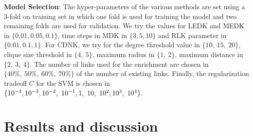 \textbf{Model Selection}: The hyper-parameters of the various methods are set using a 3-fold on training set in which one fold is used for training the model and two remaining folds are used for validation. We try the values for LEDK and MEDK in $\lbrace  0.01, 0.05, 0.1 \rbrace$, time steps in MDK in $\lbrace 3, 5, 10 \rbrace$ and RLK parameter in $\lbrace 0.01, 0.1, 1 \rbrace$. For CDNK, we try for the degree threshold value in $\lbrace 10,\ 15,\ 20 \rbrace$, clique size threshold in $\lbrace 4,\ 5 \rbrace$, maximum radius in $\lbrace 1,\ 2 \rbrace$, maximum distance in $\lbrace 2,\ 3,\ 4 \rbrace$. The number of links used for the enrichment are chosen in $\lbrace 40\%,\ 50\%,\ 60\%,\ 70\% \rbrace$ of the number of existing links. Finally, the regularization tradeoff $C$ for the SVM is chosen in $\lbrace 10^{-4}, 10^{-3}, 10^{-2},\ 10^{-1}, 1,\ 10,\ 10^2, \\ 10^3,\ 10^4 \rbrace$.
\section{Results and discussion}

